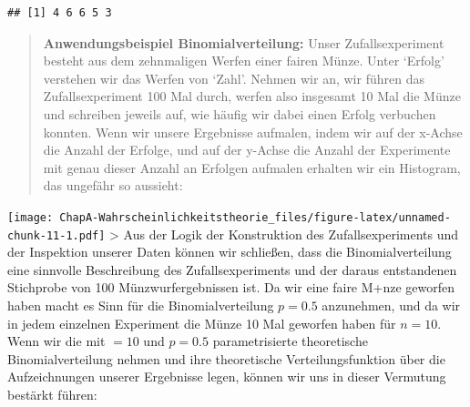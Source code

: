 \documentclass[]{book}
\begin{document}
\begin{verbatim}
## [1] 4 6 6 5 3
\end{verbatim}

\begin{quote}
\textbf{Anwendungsbeispiel Binomialverteilung:} Unser Zufallsexperiment
besteht aus dem zehnmaligen Werfen einer fairen Münze. Unter `Erfolg'
verstehen wir das Werfen von `Zahl'. Nehmen wir an, wir führen das
Zufallsexperiment 100 Mal durch, werfen also insgesamt 10 Mal die Münze
und schreiben jeweils auf, wie häufig wir dabei einen Erfolg verbuchen
konnten. Wenn wir unsere Ergebnisse aufmalen, indem wir auf der x-Achse
die Anzahl der Erfolge, und auf der y-Achse die Anzahl der Experimente
mit genau dieser Anzahl an Erfolgen aufmalen erhalten wir ein Histogram,
das ungefähr so aussieht:
\end{quote}

\texttt{[image: ChapA-Wahrscheinlichkeitstheorie\_files/figure-latex/unnamed-chunk-11-1.pdf]}
\textgreater{} Aus der Logik der Konstruktion des Zufallsexperiments und
der Inspektion unserer Daten können wir schließen, dass die
Binomialverteilung eine sinnvolle Beschreibung des Zufallsexperiments
und der daraus entstandenen Stichprobe von 100 Münzwurfergebnissen ist.
Da wir eine faire M+nze geworfen haben macht es Sinn für die
Binomialverteilung \(p=0.5\) anzunehmen, und da wir in jedem einzelnen
Experiment die Münze 10 Mal geworfen haben für \(n=10\). Wenn wir die
mit \(=10\) und \(p=0.5\) parametrisierte theoretische
Binomialverteilung nehmen und ihre theoretische Verteilungsfunktion über
die Aufzeichnungen unserer Ergebnisse legen, können wir uns in dieser
Vermutung bestärkt führen:
\end{document}
